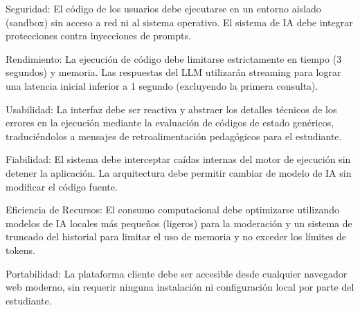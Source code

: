 \begin{nonfunctional}
    \item Seguridad: El código de los usuarios debe ejecutarse en un entorno aislado (sandbox) sin acceso a red ni al sistema operativo. El sistema de IA debe integrar protecciones contra inyecciones de prompts.
    
    \item Rendimiento: La ejecución de código debe limitarse estrictamente en tiempo (3 segundos) y memoria. Las respuestas del LLM utilizarán streaming para lograr una latencia inicial inferior a 1 segundo (excluyendo la primera consulta).
    
    \item Usabilidad: La interfaz debe ser reactiva y abstraer los detalles técnicos de los errores en la ejecución mediante la evaluación de códigos de estado genéricos, traduciéndolos a mensajes de retroalimentación pedagógicos para el estudiante.
    
    \item Fiabilidad: El sistema debe interceptar caídas internas del motor de ejecución sin detener la aplicación. La arquitectura debe permitir cambiar de modelo de IA sin modificar el código fuente.
    
    \item Eficiencia de Recursos: El consumo computacional debe optimizarse utilizando modelos de IA locales más pequeños (ligeros) para la moderación y un sistema de truncado del historial para limitar el uso de memoria y no exceder los límites de tokens.
    
    \item Portabilidad: La plataforma cliente debe ser accesible desde cualquier navegador web moderno, sin requerir ninguna instalación ni configuración local por parte del estudiante.
\end{nonfunctional}